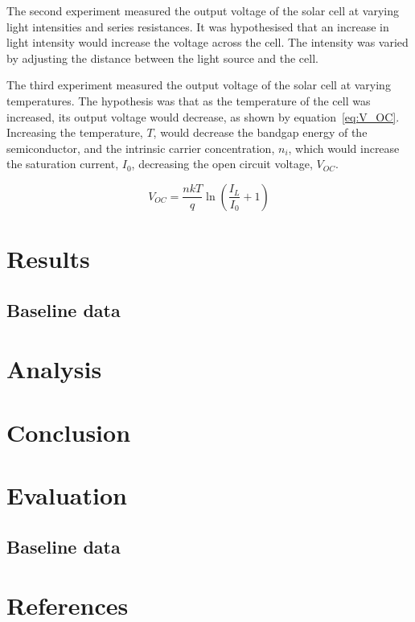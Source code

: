 \documentclass[a4paper,11pt]{article}
\begin{document}
The second experiment measured the output voltage of the solar cell at varying light intensities and series resistances. It was hypothesised that an increase in light intensity would increase the voltage across the cell. The intensity was varied by adjusting the distance between the light source and the cell.

The third experiment measured the output voltage of the solar cell at varying temperatures. The hypothesis was that as the temperature of the cell was increased, its output voltage would decrease, as shown by equation~\ref{eq:V_OC}. Increasing the temperature, $T$, would decrease the bandgap energy of the semiconductor, and the intrinsic carrier concentration, $n_i$, which would increase the saturation current, $I_0$, decreasing the open circuit voltage, $V_{OC}$.

\begin{equation} \label{eq:V_OC}
V_{OC} = \frac{nkT}{q}\ln{\left(\frac{I_L}{I_0} + 1\right)}
\end{equation}


\section{Results}
\subsection{Baseline data}

\section{Analysis}


\section{Conclusion}


\section{Evaluation}


\begin{appendices}
    \section{Baseline data}
\end{appendices}

\section{References}


\end{document}
